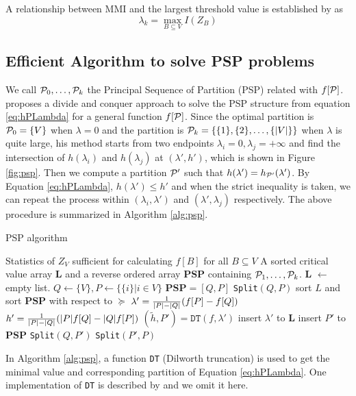 A relationship between MMI and the largest threshold value is established by \citet{agg_ic} as 
\begin{equation}\label{eq:largest_threshold}
\lambda_k = \max_{B\subseteq V} I(Z_B)
\end{equation}
\subsection{Efficient Algorithm to solve PSP problems}
We call $\P_0, \dots, \P_k$ the Principal Sequence of Partition (PSP) related with $f[\P]$.
\cite{narayanan} proposes a divide and conquer approach to solve the PSP structure from equation \eqref{eq:hPLambda} for a general function $f[\P]$.
Since the optimal partition is $\P_0 = \{V\}$ when $\lambda=0$ and the partition is $\P_k=\{\{1\}, \{2\}, \dots, \{|V|\}\}$ when $\lambda$ is quite large,
his method starts from two endpoints $\lambda_i = 0, \lambda_j = +\infty$ and find the intersection of 
$h(\lambda_i)$ and $h(\lambda_j)$ at $(\lambda', h')$, which is shown in Figure \ref{fig:psp}. Then we compute a partition $\P'$ such that $h(\lambda') = h_{\P'}(\lambda')$. By Equation \eqref{eq:hPLambda}, $h(\lambda') \leq h'$ and when the strict inequality is taken, we can repeat the process within $(\lambda_i, \lambda')$ and $(\lambda', \lambda_j)$ respectively. The above procedure is summarized in Algorithm \ref{alg:psp}.

\begin{algorithm}
\caption{PSP algorithm}\label{alg:psp}
\begin{algorithmic}[1]
\REQUIRE Statistics of $Z_V$ sufficient for calculating $f[B]$ for all $B \subseteq V$
\ENSURE A sorted critical value array \textbf{L} and a reverse ordered array \textbf{PSP} containing $\P_1,\dots, \P_k$.
\STATE \textbf{L}  $\leftarrow$ empty list.
\STATE $Q\leftarrow \{V\}, P \leftarrow \{ \{i \} | i \in V\}$
\STATE $\mathbf{PSP}= [Q, P]$
\STATE \texttt{Split}$(Q,P)$
\STATE sort $L$ and sort $\mathbf{PSP}$ with respect to $\succeq$ 
 \STATE\label{alg:gamma} $ \lambda' = {1 \over \abs{P} - \abs{Q}} (f[P]-f[Q])$
 \STATE $h' = {1 \over \abs{P} - \abs{Q}}(\abs{P} f[Q] - \abs{Q} f[P])$
 \STATE $(\tilde{h}, P') = \texttt{DT}(f, \lambda')$
 	\STATE\label{line:11} insert $\lambda'$ to $\mathbf{L}$
 \ELSE
 	\STATE insert $P'$ to $\mathbf{PSP}$
 	\STATE \texttt{Split}$(Q, P')$
 	\STATE \texttt{Split}$(P',P)$
 \ENDIF
\ENDFUNCTION
\end{algorithmic}
\end{algorithm}
In Algorithm \ref{alg:psp}, a function \texttt{DT} (Dilworth truncation) is used to get the minimal value and corresponding partition of Equation \eqref{eq:hPLambda}.
One implementation of \texttt{DT} is described by \cite{mac} and we omit it here.


